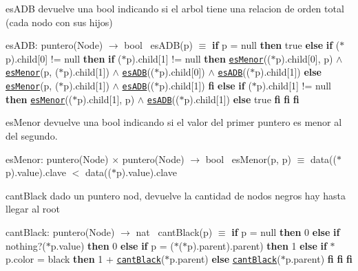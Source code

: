 \begin{DoxyParagraph}{es\+A\+DB}
devuelve una bool indicando si el arbol tiene una relacion de orden total (cada nodo con sus hijos)

es\+A\+DB\+: puntero(\+Node) $\to$ bool~\newline
 es\+A\+D\+B(p) $\equiv$ {\bfseries if} p = null {\bfseries then} true {\bfseries else} {\bfseries if} ($\ast$p).child\mbox{[}0\mbox{]} != null {\bfseries then} {\bfseries if} ($\ast$p).child\mbox{[}1\mbox{]} != null {\bfseries then} \href{axiomas.html#esMenor}{\tt es\+Menor}(($\ast$p).child\mbox{[}0\mbox{]}, p) $\land$ \href{axiomas.html#esMenor}{\tt es\+Menor}(p, ($\ast$p).child\mbox{[}1\mbox{]}) $\land$ \href{axiomas.html#esADB}{\tt es\+A\+DB}(($\ast$p).child\mbox{[}0\mbox{]}) $\land$ \href{axiomas.html#esADB}{\tt es\+A\+DB}(($\ast$p).child\mbox{[}1\mbox{]}) {\bfseries else} \href{axiomas.html#esMenor}{\tt es\+Menor}(p, ($\ast$p).child\mbox{[}1\mbox{]}) $\land$ \href{axiomas.html#esADB}{\tt es\+A\+DB}(($\ast$p).child\mbox{[}1\mbox{]}) {\bfseries fi} {\bfseries else} {\bfseries if} ($\ast$p).child\mbox{[}1\mbox{]} != null {\bfseries then} \href{axiomas.html#esMenor}{\tt es\+Menor}(($\ast$p).child\mbox{[}1\mbox{]}, p) $\land$ \href{axiomas.html#esADB}{\tt es\+A\+DB}(($\ast$p).child\mbox{[}1\mbox{]}) {\bfseries else} true {\bfseries fi} {\bfseries fi} {\bfseries fi} 
\end{DoxyParagraph}


\begin{DoxyParagraph}{es\+Menor}
devuelve una bool indicando si el valor del primer puntero es menor al del segundo.

es\+Menor\+: puntero(\+Node) $\times$ puntero(\+Node) $\to$ bool~\newline
 es\+Menor(p, p\textquotesingle{}) $\equiv$ data(($\ast$p).value).clave $<$ data(($\ast$p).value).clave 
\end{DoxyParagraph}


\begin{DoxyParagraph}{cant\+Black}
dado un puntero nod, devuelve la cantidad de nodos negros hay hasta llegar al root

cant\+Black\+: puntero(\+Node) $\to$ nat~\newline
 cant\+Black(p) $\equiv$ {\bfseries if} p = null {\bfseries then} 0 {\bfseries else} {\bfseries if} nothing?($\ast$p.value) {\bfseries then} 0 {\bfseries else} {\bfseries if} p = ($\ast$($\ast$p).parent).parent) {\bfseries then} 1 {\bfseries else} {\bfseries if} $\ast$p.color = black {\bfseries then} 1 + \href{axiomas.html#cantBlack}{\tt cant\+Black}($\ast$p.parent) {\bfseries else} \href{axiomas.html#cantBlack}{\tt cant\+Black}($\ast$p.parent) {\bfseries fi} {\bfseries fi} {\bfseries fi} 
\end{DoxyParagraph}



